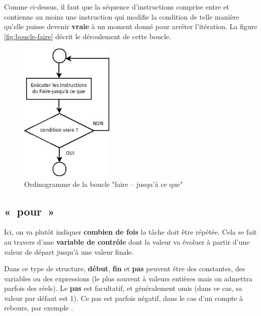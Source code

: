 
		Comme ci-dessus, il faut que la séquence d’instructions comprise entre
		 et  contienne au moins une instruction qui modifie la condition de
		telle manière qu’elle puisse devenir \textbf{vraie} à un moment donné
		pour arrêter l'itération. 
		La figure \vref{fig:boucle-faire} décrit le déroulement de cette boucle. 

		\begin{figure}[h]
		\centering
		\includegraphics[width=0.4\textwidth]{image/boucle-faire}
		\caption{Ordinogramme de la boucle "faire – jusqu'à ce que"}
		\label{fig:boucle-faire}
		\end{figure}

	\subsection{«~pour~»}

		Ici, on va plutôt indiquer \textbf{combien de fois} la tâche doit être
		répétée. Cela se fait au travers d'une
		\textbf{variable de contrôle} dont la valeur va évoluer à partir
		d'une valeur de départ jusqu'à une
		valeur finale.
		

		Dans ce type de structure, \textbf{début}, \textbf{fin} et \textbf{pas}
		peuvent être des constantes, des variables ou des expressions (le plus
		souvent à valeurs entières mais on admettra parfois des réels). Le
		\textbf{pas} est facultatif, et généralement omis (dans ce cas, sa valeur 
		par défaut est 1). Ce pas est parfois négatif, dans le cas
		d'un compte à rebours, par exemple
		.

